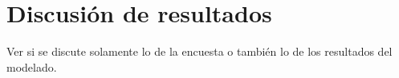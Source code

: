 
\section{Discusión de resultados}

Ver si se discute solamente lo de la encuesta o también lo de los resultados del modelado.